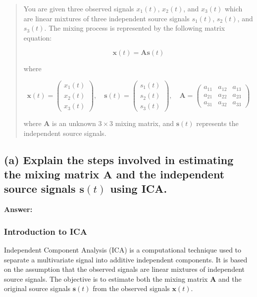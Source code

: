 \documentclass{exam}
\begin{document}
\begin{quote}
You are given three observed signals \( x_1(t) \), \( x_2(t) \), and \( x_3(t) \) which are linear mixtures of three independent source signals \( s_1(t) \), \( s_2(t) \), and \( s_3(t) \). The mixing process is represented by the following matrix equation:

\[
\mathbf{x}(t) = \mathbf{A} \mathbf{s}(t)
\]

where

\[
\mathbf{x}(t) = \begin{pmatrix} x_1(t) \\ x_2(t) \\ x_3(t) \end{pmatrix}, \quad \mathbf{s}(t) = \begin{pmatrix} s_1(t) \\ s_2(t) \\ s_3(t) \end{pmatrix}, \quad \mathbf{A} = \begin{pmatrix} a_{11} & a_{12} & a_{13} \\ a_{21} & a_{22} & a_{23} \\ a_{31} & a_{32} & a_{33} \end{pmatrix}
\]

where \( \mathbf{A} \) is an unknown \( 3 \times 3 \) mixing matrix, and \( \mathbf{s}(t) \) represents the independent source signals.
\end{quote}

\subsection{(a) Explain the steps involved in estimating the mixing matrix \(\mathbf{A}\) and the independent source signals \(\mathbf{s}(t)\) using ICA.}

\textbf{Answer:}

\subsubsection{Introduction to ICA}

Independent Component Analysis (ICA) is a computational technique used to separate a multivariate signal into additive independent components. It is based on the assumption that the observed signals are linear mixtures of independent source signals. The objective is to estimate both the mixing matrix \( \mathbf{A} \) and the original source signals \( \mathbf{s}(t) \) from the observed signals \( \mathbf{x}(t) \).
\end{document}
